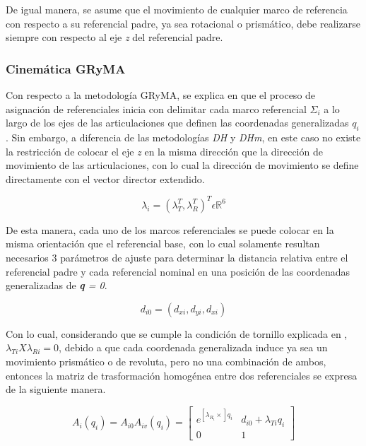         De igual manera, se asume que el movimiento de cualquier marco de referencia con respecto 
        a su referencial padre, ya sea rotacional o prismático, debe realizarse siempre con respecto 
        al eje \emph{z} del referencial padre.

    \subsubsection{Cinemática GRyMA}
        Con respecto a la metodología GRyMA, se explica en \cite{3DMotion} que el proceso de asignación 
        de referenciales inicia con delimitar cada marco referencial $\Sigma_i$ a lo largo de los ejes 
        de las articulaciones que definen las coordenadas generalizadas $q_i$. Sin embargo, a 
        diferencia de las metodologías \emph{DH} y \emph{DHm}, en este caso no existe la 
        restricción de colocar el eje \emph{z} en la misma dirección que la dirección de movimiento de las 
        articulaciones, con lo cual la dirección de movimiento se define directamente con el 
        vector director extendido.

        \begin{equation*}
            \lambda_i = (\lambda^T_T, \lambda^T_R)^T \epsilon \mathbb{R}^6
        \end{equation*}

        De esta manera, cada uno de los marcos referenciales se puede colocar en la misma 
        orientación que el referencial base, con lo cual solamente resultan necesarios 3 
        parámetros de ajuste para determinar la distancia relativa entre el referencial 
        padre y cada referencial nominal en una posición de las coordenadas generalizadas de 
        \emph{\textbf{q} = 0}.

        \begin{equation*}
            d_{i0} = (d_{xi}, d_{yi}, d_{xi})
        \end{equation*}

        Con lo cual, considerando que se cumple la condición de tornillo explicada en \cite{3DMotion}, 
        $\lambda_{Ti} X \lambda_{Ri} = 0$, debido a que cada coordenada generalizada 
        induce ya sea un movimiento prismático o de revoluta, pero no una combinación de ambos, 
        entonces la matriz de trasformación homogénea entre dos referenciales se 
        expresa de la siguiente manera.
        
        \begin{equation}
            A_i(q_i) = A_{i0} A_{iv}(q_i) = 
            \begin{bmatrix}
                e^{[\lambda_{R_i}\times]q_i} & d_{i0} + \lambda_{Ti}q_i\\
                0 & 1
            \end{bmatrix}
            \label{eq:TH_GRYMA}
        \end{equation}

